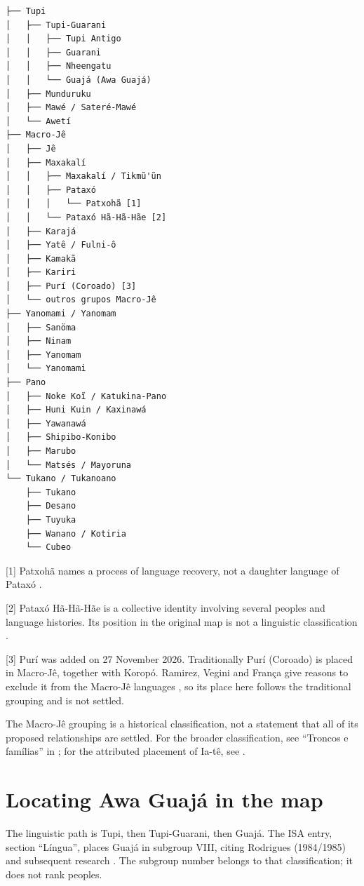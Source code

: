 \noindent
\begin{minipage}{\linewidth}
\small
\begin{verbatim}
├── Tupi
│   ├── Tupi-Guarani
│   │   ├── Tupi Antigo
│   │   ├── Guarani
│   │   ├── Nheengatu
│   │   └── Guajá (Awa Guajá)
│   ├── Munduruku
│   ├── Mawé / Sateré-Mawé
│   └── Awetí
├── Macro-Jê
│   ├── Jê
│   ├── Maxakalí
│   │   ├── Maxakalí / Tikmũ'ũn
│   │   ├── Pataxó
│   │   │   └── Patxohã [1]
│   │   └── Pataxó Hã-Hã-Hãe [2]
│   ├── Karajá
│   ├── Yatê / Fulni-ô
│   ├── Kamakã
│   ├── Kariri
│   ├── Purí (Coroado) [3]
│   └── outros grupos Macro-Jê
├── Yanomami / Yanomam
│   ├── Sanöma
│   ├── Ninam
│   ├── Yanomam
│   └── Yanomami
├── Pano
│   ├── Noke Koĩ / Katukina-Pano
│   ├── Huni Kuin / Kaxinawá
│   ├── Yawanawá
│   ├── Shipibo-Konibo
│   ├── Marubo
│   └── Matsés / Mayoruna
└── Tukano / Tukanoano
    ├── Tukano
    ├── Desano
    ├── Tuyuka
    ├── Wanano / Kotiria
    └── Cubeo
\end{verbatim}
\end{minipage}

[1] Patxohã names a process of language
recovery, not a daughter language of
Pataxó \cite{isa-pataxo}.

[2] Pataxó Hã-Hã-Hãe is a collective
identity involving several peoples and
language histories. Its position in the
original map is not a linguistic
classification \cite{isa-pataxo-hahahae}.

[3] Purí was added on 27 November 2026.
Traditionally Purí (Coroado) is placed in
Macro-Jê, together with Koropó. Ramirez,
Vegini and França give reasons to exclude
it from the Macro-Jê languages
\cite{ramirez2015koropo}, so its place here
follows the traditional grouping and is not
settled.

The Macro-Jê grouping is a historical
classification, not a statement that all
of its proposed relationships are settled.
For the broader classification, see
``Troncos e famílias'' in
\cite{isa-languages}; for the attributed
placement of Ia-tê, see
\cite{isa-fulni-o}.

\section{Locating Awa Guajá in the map}
\label{section-guaja-classification}

The linguistic path is Tupi,
then Tupi-Guarani, then Guajá.
The ISA entry, section ``Língua'', places
Guajá in subgroup VIII, citing Rodrigues
(1984/1985) and subsequent research
\cite{isa-awa-guaja}.
The subgroup number belongs to that
classification; it does not rank peoples.

